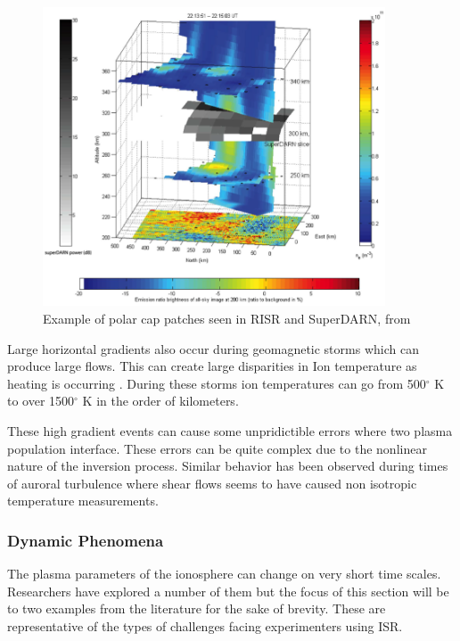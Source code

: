 \begin{figure}[!t]
\centering
\includegraphics[width=4.0in]{patches}
\caption{Example of polar cap patches seen in RISR and SuperDARN, from \cite{Dahlgren:2012dq}}
\label{fig:patches}
\end{figure}

Large horizontal gradients also occur during geomagnetic storms which can produce large flows.  This can create large disparities in Ion temperature as heating is occurring \cite{Zettergren:2008ba,semeter:plasmatransport2012}.  During these storms ion temperatures can go from 500$^\circ$ K to over 1500$^\circ$ K in the order of kilometers.

These high gradient events can cause some unpridictible errors where two plasma population interface.  These errors can be quite complex due to the nonlinear nature of the inversion process\cite{Vallinkoski1990665}.  Similar behavior has been observed during times of auroral turbulence where shear flows seems to have caused non isotropic temperature measurements\cite{knudsen1993}. 

\subsubsection{Dynamic Phenomena}

The plasma parameters of the ionosphere can change on very short time scales. Researchers have explored a number of them but the focus of this section will be to two examples from the literature for the sake of brevity. These are representative of the types of challenges facing experimenters using ISR.

